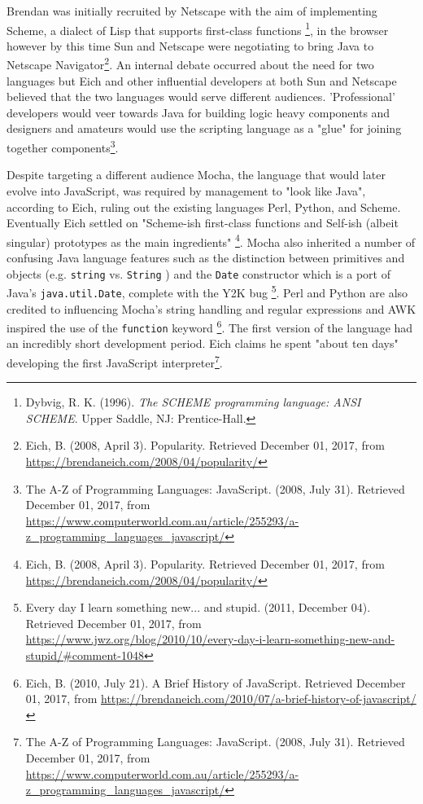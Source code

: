 \documentclass[]{article}
\begin{document}
Brendan was initially recruited by Netscape with the aim of implementing
Scheme, a dialect of Lisp that supports first-class functions \footnote{Dybvig,
  R. K. (1996). \emph{The SCHEME programming language: ANSI SCHEME}.
  Upper Saddle, NJ: Prentice-Hall.}, in the browser however by this time
Sun and Netscape were negotiating to bring Java to Netscape
Navigator\footnote{Eich, B. (2008, April 3). Popularity. Retrieved
  December 01, 2017, from
  \url{https://brendaneich.com/2008/04/popularity/}}. An internal debate
occurred about the need for two languages but Eich and other influential
developers at both Sun and Netscape believed that the two languages
would serve different audiences. 'Professional' developers would veer
towards Java for building logic heavy components and designers and
amateurs would use the scripting language as a "glue" for joining
together components\footnote{The A-Z of Programming Languages:
  JavaScript. (2008, July 31). Retrieved December 01, 2017, from
  \url{https://www.computerworld.com.au/article/255293/a-z_programming_languages_javascript/}}.

Despite targeting a different audience Mocha, the language that would
later evolve into JavaScript, was required by management to "look like
Java", according to Eich, ruling out the existing languages Perl,
Python, and Scheme. Eventually Eich settled on "Scheme-ish first-class
functions and Self-ish (albeit singular) prototypes as the main
ingredients" \footnote{Eich, B. (2008, April 3). Popularity. Retrieved
  December 01, 2017, from
  \url{https://brendaneich.com/2008/04/popularity/}}. Mocha also
inherited a number of confusing Java language features such as the
distinction between primitives and objects (e.g. \texttt{string} vs.
\texttt{String} ) and the \texttt{Date} constructor which is a port of
Java's \texttt{java.util.Date}, complete with the Y2K bug \footnote{Every
  day I learn something new... and stupid. (2011, December 04).
  Retrieved December 01, 2017, from
  \url{https://www.jwz.org/blog/2010/10/every-day-i-learn-something-new-and-stupid/\#comment-1048}}.
Perl and Python are also credited to influencing Mocha's string handling
and regular expressions and AWK inspired the use of the
\texttt{function} keyword \footnote{Eich, B. (2010, July 21). A Brief
  History of JavaScript. Retrieved December 01, 2017, from
  \url{https://brendaneich.com/2010/07/a-brief-history-of-javascript/}}.
The first version of the language had an incredibly short development
period. Eich claims he spent "about ten days" developing the first
JavaScript interpreter\footnote{The A-Z of Programming Languages:
  JavaScript. (2008, July 31). Retrieved December 01, 2017, from
  \url{https://www.computerworld.com.au/article/255293/a-z_programming_languages_javascript/}}.
\end{document}
